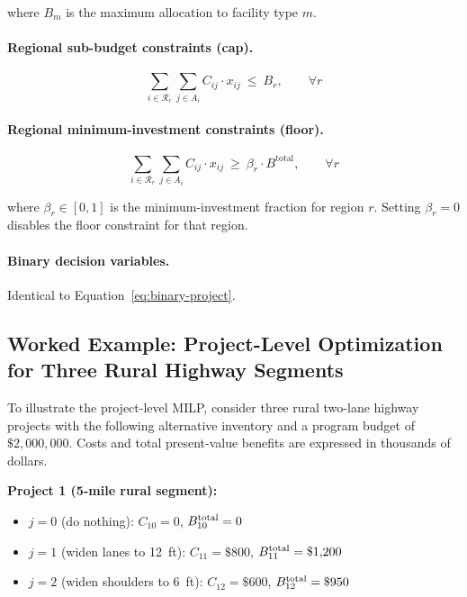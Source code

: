 \noindent where $B_m$ is the maximum allocation to facility type $m$.

\paragraph{Regional sub-budget constraints (cap).}
\begin{equation}
\sum_{i \in \mathcal{R}_r} \sum_{j \in A_i} C_{ij} \cdot x_{ij}\ \leq\ B_r,
\qquad \forall r
\label{eq:budget-region-cap}
\end{equation}

\paragraph{Regional minimum-investment constraints (floor).}
\begin{equation}
\sum_{i \in \mathcal{R}_r} \sum_{j \in A_i} C_{ij} \cdot x_{ij}\ \geq\ \beta_r \cdot B^{\mathrm{total}},
\qquad \forall r
\label{eq:budget-region-floor}
\end{equation}

\noindent where $\beta_r \in [0, 1]$ is the minimum-investment fraction for
region $r$. Setting $\beta_r = 0$ disables the floor constraint for that
region.

\paragraph{Binary decision variables.} Identical to
Equation~\ref{eq:binary-project}.

\subsection{Worked Example: Project-Level Optimization for Three Rural Highway Segments}
\label{sec:milp-worked}

To illustrate the project-level MILP, consider three rural two-lane
highway projects with the following alternative inventory and a program
budget of $\$2{,}000{,}000$. Costs and total present-value benefits are
expressed in thousands of dollars.

\textbf{Project 1 (5-mile rural segment):}
\begin{itemize}[leftmargin=2em, itemsep=2pt]
  \item $j = 0$ (do nothing): $C_{10} = 0$, $B^{\mathrm{total}}_{10} = 0$
  \item $j = 1$ (widen lanes to 12~ft): $C_{11} = \$800$, $B^{\mathrm{total}}_{11} = \$1{,}200$
  \item $j = 2$ (widen shoulders to 6~ft): $C_{12} = \$600$, $B^{\mathrm{total}}_{12} = \$950$
\end{itemize}

